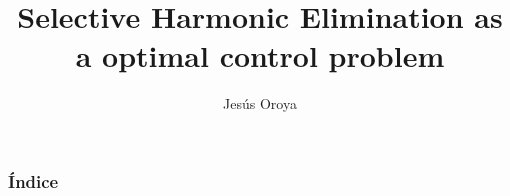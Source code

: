 \documentclass[Berkeley]{beamer}
\title{Selective Harmonic Elimination as a optimal control problem}
\author{Jesús Oroya}
\institute{Chair of Computational Mathematics}
\begin{document}
    \maketitle
    \begin{frame}
        \frametitle{Índice}
        \tableofcontents    
    \end{frame}


    
    
    
    
\end{document}
